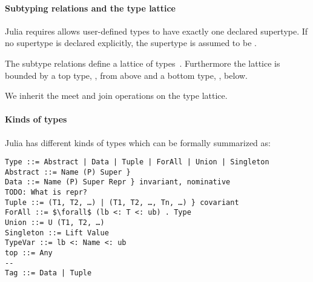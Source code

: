 \documentclass[pldi]{sigplanconf-pldi15}
\begin{document}
\paragraph{Subtyping relations and the type lattice}

Julia requires allows user-defined types to have exactly one declared supertype.
If no supertype is declared explicitly, the supertype is assumed to be .

The subtype relations define a lattice of types~\cite{Scott1976}. Furthermore
the lattice is bounded by a top type, , from above and a bottom
type, , below.

We inherit the meet and join operations on the type lattice.

\paragraph{Kinds of types}
Julia has different kinds of types which can be formally summarized as:

\begin{verbatim}
Type ::= Abstract | Data | Tuple | ForAll | Union | Singleton
Abstract ::= Name (P) Super }
Data ::= Name (P) Super Repr } invariant, nominative
TODO: What is repr?
Tuple ::= (T1, T2, …) | (T1, T2, …, Tn, …) } covariant
ForAll ::= $\forall$ (lb <: T <: ub) . Type
Union ::= U (T1, T2, …)
Singleton ::= Lift Value
TypeVar ::= lb <: Name <: ub
top ::= Any
--
Tag ::= Data | Tuple
\end{verbatim}
\end{document}
